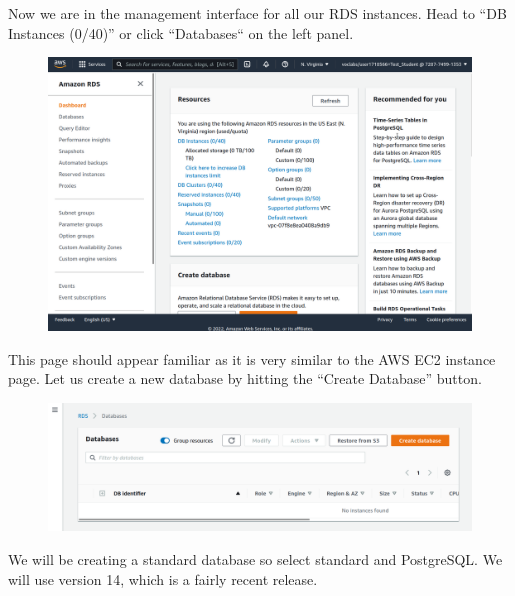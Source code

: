 \documentclass{csse4400}
\begin{document}
Now we are in the management interface for all our RDS instances.
Head to ``DB Instances (0/40)'' or click ``Databases`` on the left panel.

\begin{figure}[H]
\includegraphics[width=\textwidth]{images/aws_2}
\end{figure}

This page should appear familiar as it is very similar to the AWS EC2 instance page.
Let us create a new database by hitting the ``Create Database'' button.

\begin{figure}[H]
\includegraphics[width=\textwidth]{images/aws_3}
\end{figure}



We will be creating a standard database so select standard and PostgreSQL.
We will use version 14, which is a fairly recent release.
\end{document}
